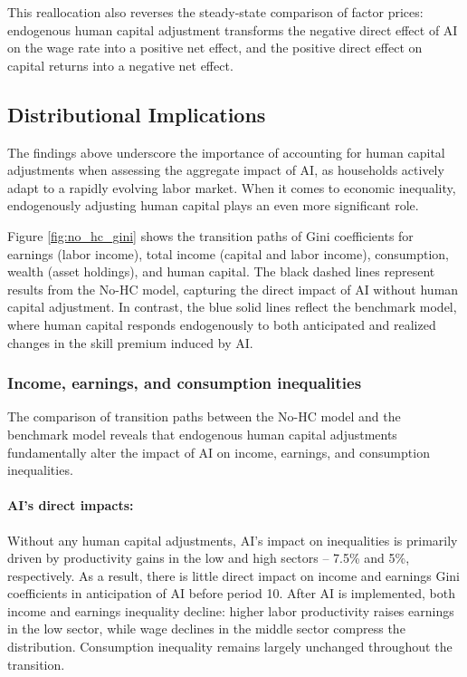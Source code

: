 \documentclass[12pt]{article}
\begin{document}
This reallocation also reverses the steady-state comparison of factor prices: endogenous human capital adjustment transforms the negative direct effect of AI on the wage rate into a positive net effect, and the positive direct effect on capital returns into a negative net effect.


\subsection{Distributional Implications}

The findings above underscore the importance of accounting for human capital adjustments when assessing the aggregate impact of AI, as households actively adapt to a rapidly evolving labor market. When it comes to economic inequality, endogenously adjusting human capital plays an even more significant role.

Figure \ref{fig:no_hc_gini} shows the transition paths of Gini coefficients for earnings (labor income), total income (capital and labor income), consumption, wealth (asset holdings), and human capital. The black dashed lines represent results from the No-HC model, capturing the direct impact of AI without human capital adjustment. In contrast, the blue solid lines reflect the benchmark model, where human capital responds endogenously to both anticipated and realized changes in the skill premium induced by AI.

\subsubsection{Income, earnings, and consumption inequalities}
The comparison of transition paths between the No-HC model and the benchmark model reveals that endogenous human capital adjustments fundamentally alter the impact of AI on income, earnings, and consumption inequalities.

\paragraph{AI's direct impacts:} Without any human capital adjustments, AI's impact on inequalities is primarily driven by productivity gains in the low and high sectors -- 7.5\% and 5\%, respectively. As a result, there is little direct impact on income and earnings Gini coefficients in anticipation of AI before period 10. After AI is implemented, both income and earnings inequality decline: higher labor productivity raises earnings in the low sector, while wage declines in the middle sector compress the distribution. Consumption inequality remains largely unchanged throughout the transition.
\end{document}
